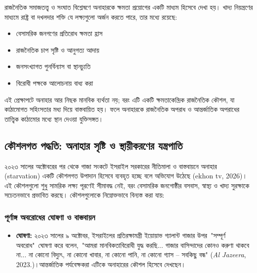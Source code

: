 রাজনৈতিক সমাজতত্ত্ব ও সংঘাত বিশ্লেষণে অনাহারকে ক্ষমতা প্রয়োগের একটি মাধ্যম
হিসেবে দেখা হয়। খাদ্য নিয়ন্ত্রণের মাধ্যমে রাষ্ট্র বা দখলদার শক্তি যে লক্ষ্যগুলো
অর্জন করতে পারে, তার মধ্যে রয়েছে:

\begin{itemize}
\item
  বেসামরিক জনগণের প্রতিরোধ ক্ষমতা হ্রাস
\item
  রাজনৈতিক চাপ সৃষ্টি ও আনুগত্য আদায়
\item
  জনসংখ্যাগত পুনর্বিন্যাস বা স্থানচ্যুতি
\item
  বিরোধী পক্ষকে আলোচনায় বাধ্য করা
\end{itemize}

এই প্রেক্ষাপটে অনাহার আর নিছক মানবিক ব্যর্থতা নয়; বরং এটি একটি ক্ষমতাকেন্দ্রিক
রাজনৈতিক কৌশল, যা কাঠামোগত সহিংসতার মধ্য দিয়ে বাস্তবায়িত হয়। ফলে অনাহারকে
রাজনৈতিক অপরাধ ও আন্তর্জাতিক অপরাধের তাত্ত্বিক কাঠামোর মধ্যে স্থান দেওয়া
যুক্তিসঙ্গত।

\subsection{কৌশলগত পদ্ধতি: অনাহার সৃষ্টি ও স্থায়ীকরণের
যন্ত্রপাতি}\label{ux995ux9b6ux9b2ux997ux9a4-ux9aaux9a6ux9a7ux9a4-ux985ux9a8ux9b9ux9b0-ux9b8ux9b7ux99f-ux993-ux9b8ux9a5ux9afux995ux9b0ux9a3ux9b0-ux9afux9a8ux9a4ux9b0ux9aaux9a4}

২০২৩ সালের অক্টোবরের পর থেকে গাজা সংকটে ইসরাইল সরকারের নীতিমালা ও
বাস্তবায়নে অনাহার (starvation) একটি কৌশলগত উপাদান হিসেবে ব্যবহৃত হচ্ছে বলে
অভিযোগ উঠেছে (ekhon tv, 2026)। এই কৌশলগুলো শুধু সামরিক লক্ষ্য পূরণেই সীমাবদ্ধ
নেই, বরং বেসামরিক জনগোষ্ঠীর বসবাস, স্বাস্থ‌্য ও খাদ্য সুরক্ষাকে সচেতনভাবে
প্রভাবিত করছে। কৌশলগুলোকে নিম্নোক্তভাবে বিন্যস্ত করা যায়:

\subsubsection{পূর্ণাঙ্গ অবরোধের ঘোষণা ও
বাস্তবায়ন}\label{ux9aaux9b0ux9a3ux999ux997-ux985ux9acux9b0ux9a7ux9b0-ux998ux9b7ux9a3-ux993-ux9acux9b8ux9a4ux9acux9afux9a8}

\begin{itemize}
\item
  \textbf{ঘোষণা:} ২০২৩ সালের ৯ অক্টোবর, ইসরাইলের প্রতিরক্ষামন্ত্রী ইয়োয়াভ
  গ্যালান্ট গাজার উপর~"সম্পূর্ণ অবরোধ"~ঘোষণা করে বলেন,~"আমরা মানবিকতাবিরোধী
  যুদ্ধ করছি... গাজার বাসিন্দাদের কোনও করুণা থাকবে না... না কোনো বিদ্যুৎ, না
  কোনো খাবার, না কোনো পানি, না কোনো গ্যাস -- সবকিছু বন্ধ" (\emph{Al
  Jazeera}, 2023.)।আন্তর্জাতিক পর্যবেক্ষকরা এটিকে অনাহারের কৌশল হিসেবে
  দেখছেন।
\end{itemize}

